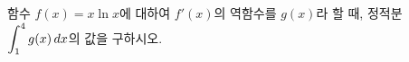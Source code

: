 함수 $f(x)=x\ln x$에 대하여 $f'(x)$의 역함수를 $g(x)$라 할 때, 정적분 $\displaystyle\int_{1}^{4}g(x)\mkern3mu dx$의 값을 구하시오.
